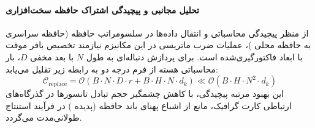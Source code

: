 \paragraph{تحلیل مجانبی و پیچیدگی اشتراک حافظه سخت‌افزاری}
از منظر پیچیدگی محاسباتی و انتقال داده‌ها در سلسومراتب حافظه (حافظه سراسری  به حافظه محلی )، عملیات ضرب ماتریسی در این مکانیزم نیازمند تخصیص بافر موقت با ابعاد فاکتورگیری‌شده است. برای پردازش دنباله‌ای به طول $N$ با بعد مخفی $D$، بار محاسباتی هسته از فرم درجه دو به رابطه زیر تقلیل می‌یابد:
\begin{equation}
\label{eq:complexity_replace}
\mathcal{C}_{\text{replace}} = \mathcal{O}\left( B \cdot N \cdot D \cdot r + B \cdot H \cdot N \cdot d_k \right) \ll \mathcal{O}\left( B \cdot H \cdot N^2 \cdot d_k \right)
\end{equation}
این بهبود مرتبه پیچیدگی، با کاهش چشمگیر حجم تبادل تانسورها در گذرگاه‌های ارتباطی کارت گرافیک، مانع از اشباع پهنای باند حافظه (پدیده ) در فرآیند استنتاج طولانی‌مدت می‌گردد.
